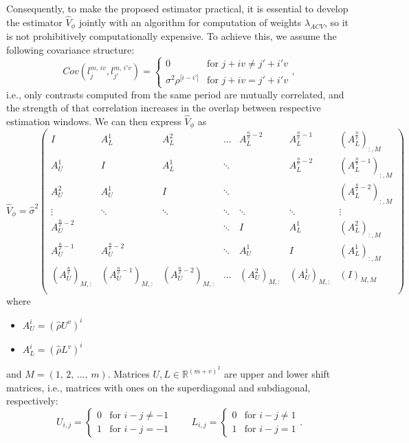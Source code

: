 \documentclass[11pt,dvipsnames]{article}
\begin{document}
Consequently, to make the proposed estimator practical, it is essential to develop the estimator $ \widehat{V}_{\phi} $ jointly with an algorithm for computation of weights $ \widehat{\lambda}_{ACV} $, so it is not prohibitively computationally expensive. To achieve this, we assume the following covariance structure:
\begin{equation}\label{eq:VphiStructured0} 
Cov(l_{j}^{m,\,iv },l_{j'}^{m,\,i'v })=
\begin{cases}
0 &\text{for $j+iv \neq j'+i'v$}\\
\sigma^{2}\rho^{|i-i'|} &\text{for $j+iv = j'+i'v$}
\end{cases},
\end{equation}
i.e., only contrasts computed from the same period are mutually correlated, and the strength of that correlation increases in the overlap between respective estimation windows. We can then express $ \widehat{V}_{\phi} $ as
\begin{equation}\label{eq:VphiStructured} 
\widehat{V}_{\phi}=
\hat{\sigma}^{2}
\begin{pmatrix}
I  & A_{L}^{1} & A_{L}^{2} & \dots & A_{L}^{\frac{n}{v}-2} & A_{L}^{\frac{n}{v}-1} & (A_{L}^{\frac{n}{v}})_{:,M} \\
A_{U}^{1}  & I & A_{L}^{1} & \ddots & & A_{L}^{\frac{n}{v}-2} & (A_{L}^{\frac{n}{v}-1})_{:,M}\\
A_{U}^{2}  & A_{U}^{1} & I & \ddots &  &  & (A_{L}^{\frac{n}{v}-2})_{:,M}\\
\vdots & \ddots  & \ddots  & \ddots & \ddots & \ddots & \vdots\\
A_{U}^{\frac{n}{v}-2} &   &   & \ddots & I & A_{L}^{1} & (A_{L}^{2})_{:,M}\\
A_{U}^{\frac{n}{v}-1}  & A_{U}^{\frac{n}{v}-2} &   & \ddots & A_{U}^{1}  & I & (A_{L}^{1})_{:,M}\\
(A_{U}^{\frac{n}{v}})_{M,:}  & (A_{U}^{\frac{n}{v}-1})_{M,:} & (A_{U}^{\frac{n}{v}-2})_{M,:} & \dots & (A_{U}^{2})_{M,:} & (A_{U}^{1})_{M,:}  &  (I)_{M,M} \\
\end{pmatrix}
\end{equation}
where
\begin{itemize}
\item $ A_{U}^{i}=\left(\hat{\rho} U^{v}\right)^{i}  $
\item $ A_{L}^{i}=\left(\hat{\rho} L^{v}\right)^{i}  $
\end{itemize}
and $ M=\left(1,\,2,\,\ldots,\,m \right)  $. Matrices $ U,L \in \mathbb{R}^{\left( m+v\right)^{2}}$ are upper and lower shift matrices, i.e., matrices with ones on the superdiagonal and subdiagonal, respectively:
\begin{equation}
U_{i,j}=
\begin{cases}
0 &\text{for $i-j\neq -1$}\\
1 &\text{for $i-j = -1$}
\end{cases} 
\qquad 
L_{i,j}=
\begin{cases}
0 &\text{for $i-j\neq 1$}\\
1 &\text{for $i-j = 1$}
\end{cases}.
\end{equation}
\end{document}
